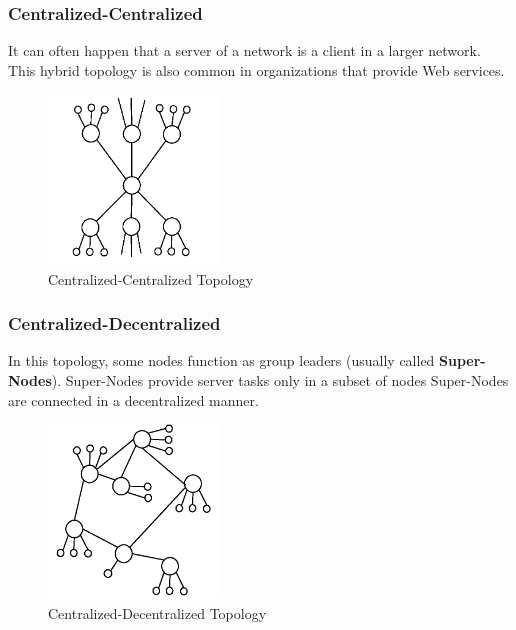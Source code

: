 \subsubsection{Centralized-Centralized}

It can often happen that a server of a network is a client in a larger
network. This hybrid topology is also common in organizations that provide
Web services.

\begin{figure}
  \centering
  \includegraphics[width=0.4\textwidth]{src/img/p2p-systems/centralized-centralized}
  \caption{Centralized-Centralized Topology}
  \label{fig:p2p-systems:centralized-centralized}
\end{figure}

\subsubsection{Centralized-Decentralized}

In this topology, some nodes function as group leaders (usually called
\textbf{Super-Nodes}). Super-Nodes provide server tasks only in a subset of
nodes  Super-Nodes are connected in a decentralized manner.

\begin{figure}
  \centering
  \includegraphics[width=0.4\textwidth]{src/img/p2p-systems/centralized-decentralized}
  \caption{Centralized-Decentralized Topology}
  \label{fig:p2p-systems:centralized-decentralized}
\end{figure}

